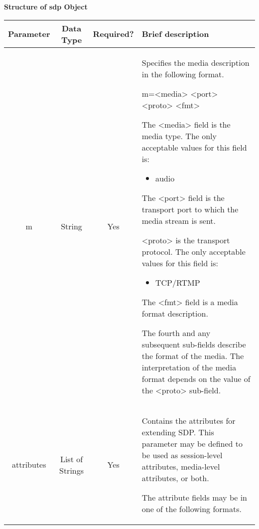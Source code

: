 \textbf{\footnotesize{Structure of sdp Object}}{\footnotesize \par}

{\footnotesize{}}%
\begin{longtable}{|c||c||c||>{\raggedright}p{}|}
\hline 
\textbf{\footnotesize{Parameter}} & \textbf{\footnotesize{Data Type}} & \textbf{\footnotesize{Required?}} & \textbf{\footnotesize{Brief description}}\tabularnewline
\hline 
\hline 
{\footnotesize{m}} & {\footnotesize{String}} & {\footnotesize{Yes}} & {\small{Specifies the media description in the following format.}}{\small \par}

{\small{m=<media> <port> <proto> <fmt>}}{\small \par}

{\small{The <media> field is the media type. }}{\footnotesize{The
only acceptable values for this field is:}}{\footnotesize \par}
\begin{itemize}
\item {\small{audio}}{\small \par}
\end{itemize}
{\small{The <port> field is the transport port to which the media
stream is sent.}}{\small \par}

{\small{<proto> is the transport protocol. }}{\footnotesize{The only
acceptable values for this field is:}}{\footnotesize \par}
\begin{itemize}
\item {\small{TCP/RTMP}}{\small \par}
\end{itemize}
{\small{The <fmt> field is a media format description.}}{\small \par}

{\small{The fourth and any subsequent sub-fields describe the format
of the media. The interpretation of the media format depends on the
value of the <proto> sub-field.}}\tabularnewline
\hline 
\hline 
{\footnotesize{attributes}} & {\footnotesize{List of Strings}} & {\footnotesize{Yes}} & {\small{Contains the attributes for extending SDP. This parameter
may be defined to be used as session-level attributes, media-level
attributes, or both.}}{\small \par}

{\small{The attribute fields may be in one of the following formats.}}{\small \par}


\end{longtable}
